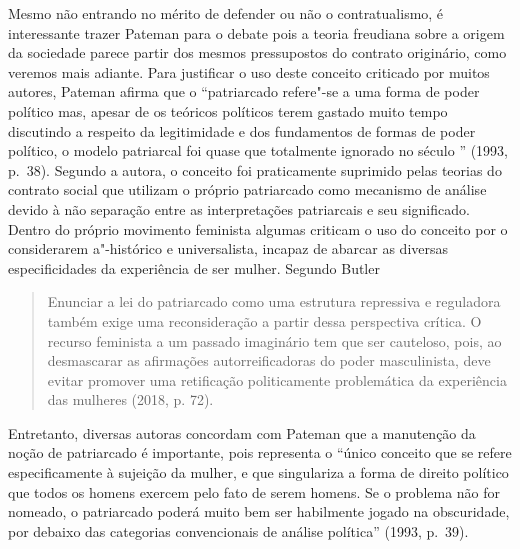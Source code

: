 Mesmo não entrando no mérito de defender ou não o contratualismo, é
interessante trazer Pateman para o debate pois a teoria freudiana
sobre a origem da sociedade parece partir dos mesmos pressupostos do
contrato originário, como veremos mais adiante. Para justificar o uso
deste conceito criticado por muitos autores, Pateman afirma que
o ``patriarcado refere"-se a uma forma de poder político
mas, apesar de os teóricos políticos terem gastado muito tempo
discutindo a respeito da legitimidade e dos fundamentos de formas de
poder político, o modelo patriarcal foi quase que totalmente ignorado no
século '' (1993, p.~38). Segundo a autora, o conceito foi praticamente
suprimido pelas teorias do contrato social que utilizam o próprio
patriarcado como mecanismo de análise devido à não separação entre as
interpretações patriarcais e seu significado. Dentro do próprio
movimento feminista algumas criticam o uso do conceito por o
considerarem a"-histórico e universalista, incapaz de abarcar as diversas
especificidades da experiência de ser mulher. Segundo Butler

\begin{quote}
Enunciar a lei do patriarcado como uma estrutura repressiva e reguladora
também exige uma reconsideração a partir dessa perspectiva crítica. O
recurso feminista a um passado imaginário tem que ser cauteloso, pois,
ao desmascarar as afirmações autorreificadoras do poder masculinista,
deve evitar promover uma retificação politicamente problemática da
experiência das mulheres (2018, p. 72).
\end{quote}

Entretanto, diversas autoras concordam com Pateman que a
manutenção da noção de patriarcado é importante, pois representa o
``único conceito que se refere especificamente à sujeição da mulher, e
 que singulariza a forma de direito político que todos os homens exercem
 pelo fato de serem homens. Se o problema não for nomeado, o patriarcado
 poderá muito bem ser habilmente jogado na obscuridade, por debaixo das
 categorias convencionais de análise política'' (1993, p.~39).

